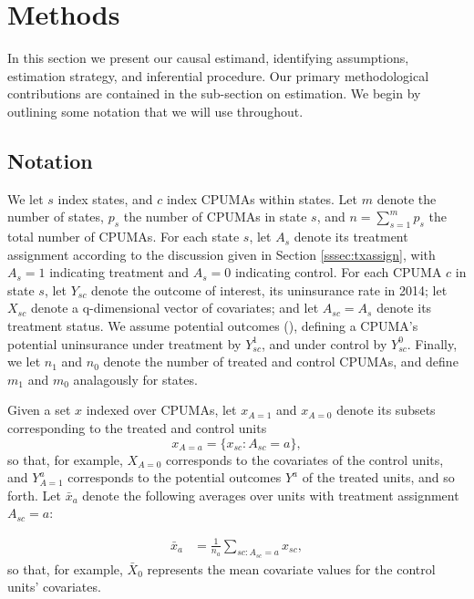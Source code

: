 \documentclass[aoas]{imsart}
\theoremstyle{plain}
\theoremstyle{remark}
\begin{document}
\section{Methods}\label{sec:methods}

In this section we present our causal estimand, identifying assumptions, estimation strategy, and inferential procedure. Our primary methodological contributions are contained in the sub-section on estimation. We begin by outlining some notation that we will use throughout.

\subsection{Notation}
We let $s$ index states, and $c$ index CPUMAs within states. Let $m$ denote the number of states, $p_s$  the number of CPUMAs in state $s$, and $n = \sum_{s=1}^m p_s$ the total number of CPUMAs. For each state $s$, let $A_s$ denote its treatment assignment according to the discussion given in Section \ref{sssec:txassign}, with $A_s = 1$ indicating treatment and $A_s=0$ indicating control. For each CPUMA $c$ in state $s$, let $Y_{sc}$ denote the outcome of interest, its uninsurance rate in 2014; let $X_{sc}$ denote a q-dimensional vector of covariates; and let $A_{sc} = A_{s}$ denote its treatment status. We assume potential outcomes (\cite{rubin2005causal}), defining a CPUMA's potential uninsurance under treatment by $Y^1_{sc}$, and under control by $Y^0_{sc}$. Finally, we let $n_1$ and $n_0$ denote the number of treated and control CPUMAs, and define $m_1$ and $m_0$ analagously for states.

Given a set $x$ indexed over CPUMAs, let $x_{A=1}$ and $x_{A=0}$ denote its subsets corresponding to the treated and control units
\[ x_{A=a} = \{x_{sc}: A_{sc}=a\},\]
so that, for example, $X_{A=0}$ corresponds to the covariates of the control units, and $Y_{A=1}^a$ corresponds to the potential outcomes $Y^a$ of the treated units, and so forth. Let $\bar{x}_a$ denote the following averages over units with treatment assignment $A_{sc} = a$:

\begin{align*}
	\bar{x}_a & = \frac{1}{n_a} \sum_{sc: A_{sc}=a} x_{sc},
\end{align*}
so that, for example, $\bar{X}_0$ represents the mean covariate values for the control units' covariates. %
\end{document}
